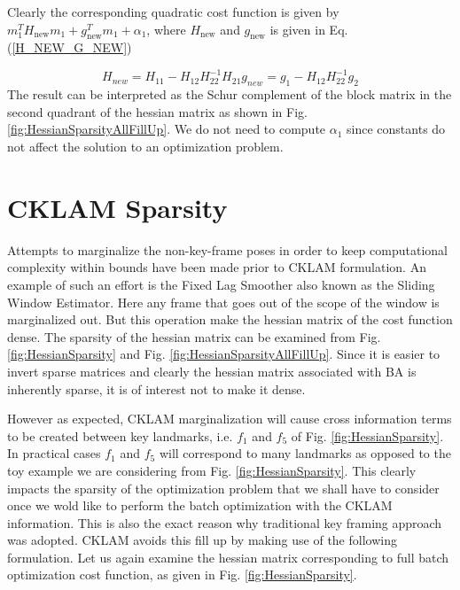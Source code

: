 Clearly the corresponding quadratic cost function is given by $m_1^TH_\mathrm{new}m_1 + g_\mathrm{new}^Tm_1 + \alpha_1$, where $H_\mathrm{new}$ and $g_\mathrm{new}$ is given in Eq.(\ref{H_NEW_G_NEW})

\begin{subequations}
	\begin{equation}
		H_{new} = H_{11} - H_{12}H_{22}^{-1}H_{21}
	\end{equation}

	\begin{equation}
		g_{new} = g_1 - H_{12}H_{22}^{-1}g_2
	\end{equation}
	\label{H_NEW_G_NEW}
\end{subequations}
The result can be interpreted as the Schur complement of the block matrix in the second quadrant of the hessian matrix as shown in Fig. \ref{fig:HessianSparsityAllFillUp}. We do not need to compute $\alpha_1$ since constants do not affect the solution to an optimization problem.

\section{CKLAM Sparsity}
Attempts to marginalize the non-key-frame poses in order to keep computational complexity within bounds have been made prior to CKLAM formulation. An example of such an effort is the Fixed Lag Smoother also known as the Sliding Window Estimator. Here any frame that goes out of the scope of the window is marginalized out. But this operation make the hessian matrix of the cost function dense. The sparsity of the hessian matrix can be examined from Fig. \ref{fig:HessianSparsity} and Fig. \ref{fig:HessianSparsityAllFillUp}. Since it is easier to invert sparse matrices and clearly the hessian matrix associated with BA is inherently sparse, it is of interest not to make it dense.

However as expected, CKLAM marginalization will cause cross information terms to be created between key landmarks, i.e. $f_1$ and $f_5$ of Fig. \ref{fig:HessianSparsity}. In practical cases $f_1$ and $f_5$ will correspond to many landmarks as opposed to the toy example we are considering from Fig. \ref{fig:HessianSparsity}. This clearly impacts the sparsity of the optimization problem that we shall have to consider once we wold like to perform the batch optimization with the CKLAM information. This is also the exact reason why traditional key framing approach was adopted. CKLAM avoids this fill up by making use of the following formulation. Let us again examine the hessian matrix corresponding to full batch optimization cost function, as given in Fig. \ref{fig:HessianSparsity}.

